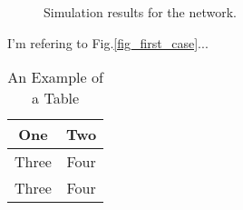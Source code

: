 \documentclass[journal]{IEEEtran}
\begin{document}


%
\begin{figure*}[!t]
\centering
{}
\hfil
{}
\caption{Simulation results for the network.}
\label{fig_sim2}
\end{figure*}
\newpage
I'm refering to Fig.\ref{fig_first_case}...



\begin{table}[!t]
\renewcommand{\arraystretch}{1.3}
\caption{An Example of a Table}
\label{table_example}
\centering
	\begin{tabular}{cc}
		\toprule
		One & Two\\
		\midrule
		Three & Four\\
		Three & Four\\
		\bottomrule
	\end{tabular}
\end{table}


\end{document}
